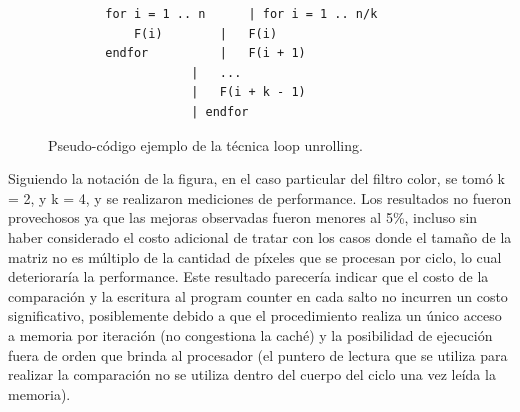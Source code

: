\begin{figure}[h]
	\begin{mdframed}
	\begin{center}
		\begin{lstlisting}
		for i = 1 .. n		| for i = 1 .. n/k
			F(i)		| 	F(i)
		endfor			| 	F(i + 1)
					| 	...
					| 	F(i + k - 1)
					| endfor
		\end{lstlisting}
	\end{center}
	\end{mdframed}
	\caption{Pseudo-código ejemplo de la técnica loop unrolling.}
	\label{fig:filtro-color-loop-unrolling}
\end{figure}

Siguiendo la notación de la figura, en el caso particular del filtro color, se tomó k = 2, y k = 4, y se realizaron mediciones de performance. Los resultados no fueron provechosos ya que las mejoras observadas fueron menores al 5\%, incluso sin haber considerado el costo adicional de tratar con los casos donde el tamaño de la matriz no es múltiplo de la cantidad de píxeles que se procesan por ciclo, lo cual deterioraría la performance. Este resultado parecería indicar que el costo de la comparación y la escritura al program counter en cada salto no incurren un costo significativo, posiblemente debido a que el procedimiento realiza un único acceso a memoria por iteración (no congestiona la caché) y la posibilidad de ejecución fuera de orden que brinda al procesador (el puntero de lectura que se utiliza para realizar la comparación no se utiliza dentro del cuerpo del ciclo una vez leída la memoria).
